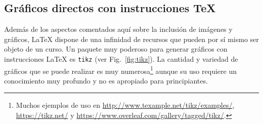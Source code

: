 \documentclass[11pt,a4paper]{article}
\begin{document}
\subsection{Gráficos directos con instrucciones \TeX}
Además de los aspectos comentados aquí sobre la inclusión de imágenes y gráficos, \LaTeX{} dispone de una infinidad de recursos que pueden por sí mismo ser objeto de un curso. Un paquete muy poderoso para generar gráficos con instrucciones \LaTeX{} es \texttt{tikz} (ver Fig.~\ref{fig:tikz}). La cantidad y variedad de gráficos que se puede realizar es muy numerosa\footnote{Muchos ejemplos de uso en \url{http://www.texample.net/tikz/examples/}, \url{https://tikz.net/} y \url{https://www.overleaf.com/gallery/tagged/tikz/}.} aunque su uso requiere un conocimiento muy profundo y no es apropiado para principiantes.
\end{document}
